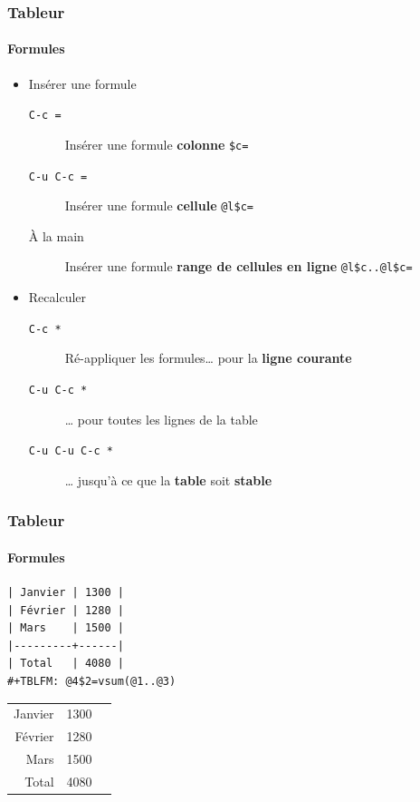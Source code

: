 \documentclass[presentation,t,hideothersubsections]{beamer}
\begin{document}
\begin{frame}
\frametitle{Tableur}
\framesubtitle{Formules}
\label{sec-3-3-7}


\begin{itemize}
\item Insérer une formule
\begin{description}
\item[\texttt{C-c =}] Insérer une formule \textbf{colonne} \texttt{\$c=}
\item[\texttt{C-u C-c =}] Insérer une formule \textbf{cellule} \texttt{@l\$c=}
\item[À la main] Insérer une formule \textbf{range de cellules en ligne} \texttt{@l\$c..@l\$c=}
\end{description}
\item Recalculer
\begin{description}
\item[\texttt{C-c *}] Ré-appliquer les formules\ldots{} pour la \textbf{ligne courante}
\item[\texttt{C-u C-c *}] \ldots{} pour toutes les lignes de la table
\item[\texttt{C-u C-u C-c *}] \ldots{} jusqu'à ce que la \textbf{table} soit \textbf{stable}
\end{description}
\end{itemize}
\end{frame}
\begin{frame}[fragile]
\frametitle{Tableur}
\framesubtitle{Formules}
\label{sec-3-3-8}



\lstset{language=org}
\begin{lstlisting}
| Janvier | 1300 |
| Février | 1280 |
| Mars    | 1500 |
|---------+------|
| Total   | 4080 |
#+TBLFM: @4$2=vsum(@1..@3)
\end{lstlisting}


\begin{center}
\begin{tabular}{r@{~:~}r@{~\EUR}l}
 Janvier  &  1300  \\
 Février  &  1280  \\
 Mars     &  1500  \\
\hline
 Total    &  4080  \\
\end{tabular}
\end{center}
\end{frame}
\end{document}
